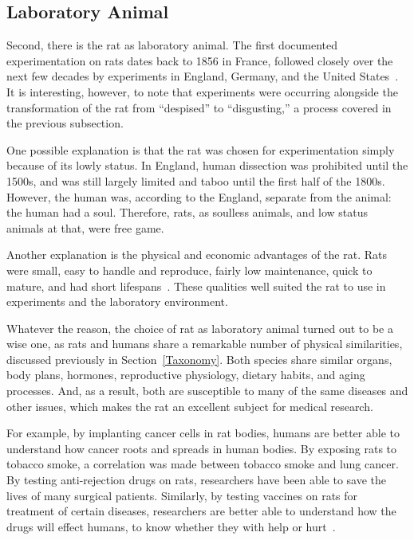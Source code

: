 \documentclass[12pt]{article}
\begin{document}
\subsection{Laboratory Animal} \label{Research}

Second, there is the rat as laboratory animal. The first documented experimentation on rats dates back to 1856 in France, followed closely over the next few decades by experiments in England, Germany, and the United States~\cite{Edelman2002}. It is interesting, however, to note that experiments were occurring alongside the transformation of the rat from ``despised'' to ``disgusting,'' a process covered in the previous subsection.

One possible explanation is that the rat was chosen for experimentation simply because of its lowly status. In England, human dissection was prohibited until the 1500s, and was still largely limited and taboo until the first half of the 1800s. However, the human was, according to the England, separate from the animal: the human had a soul. Therefore, rats, as soulless animals, and low status animals at that, were free game.

Another explanation is the physical and economic advantages of the rat. Rats were small, easy to handle and reproduce, fairly low maintenance, quick to mature, and had short lifespans~\cite{Edelman2002}. These qualities well suited the rat to use in experiments and the laboratory environment.

Whatever the reason, the choice of rat as laboratory animal turned out to be a wise one, as rats and humans share a remarkable number of physical similarities, discussed previously in Section~\ref{Taxonomy}. Both species share similar organs, body plans, hormones, reproductive physiology, dietary habits, and aging processes. And, as a result, both are susceptible to many of the same diseases and other issues, which makes the rat an excellent subject for medical research.

For example, by implanting cancer cells in rat bodies, humans are better able to understand how cancer roots and spreads in human bodies. By exposing rats to tobacco smoke, a correlation was made between tobacco smoke and lung cancer. By testing anti-rejection drugs on rats, researchers have been able to save the lives of many surgical patients. Similarly, by testing vaccines on rats for treatment of certain diseases, researchers are better able to understand how the drugs will effect humans, to know whether they with help or hurt~\cite{Marrin2006}.
\end{document}
